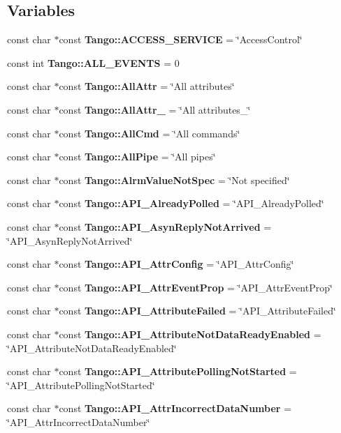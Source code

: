 \subsection*{Variables}
\begin{DoxyCompactItemize}
\item 
const char $\ast$const {\bf Tango\-::\-A\-C\-C\-E\-S\-S\-\_\-\-S\-E\-R\-V\-I\-C\-E} = \char`\"{}Access\-Control\char`\"{}
\item 
const int {\bf Tango\-::\-A\-L\-L\-\_\-\-E\-V\-E\-N\-T\-S} = 0
\item 
const char $\ast$const {\bf Tango\-::\-All\-Attr} = \char`\"{}All attributes\char`\"{}
\item 
const char $\ast$const {\bf Tango\-::\-All\-Attr\-\_} = \char`\"{}All attributes\-\_\char`\"{}
\item 
const char $\ast$const {\bf Tango\-::\-All\-Cmd} = \char`\"{}All commands\char`\"{}
\item 
const char $\ast$const {\bf Tango\-::\-All\-Pipe} = \char`\"{}All pipes\char`\"{}
\item 
const char $\ast$const {\bf Tango\-::\-Alrm\-Value\-Not\-Spec} = \char`\"{}Not specified\char`\"{}
\item 
const char $\ast$const {\bf Tango\-::\-A\-P\-I\-\_\-\-Already\-Polled} = \char`\"{}A\-P\-I\-\_\-\-Already\-Polled\char`\"{}
\item 
const char $\ast$const {\bf Tango\-::\-A\-P\-I\-\_\-\-Asyn\-Reply\-Not\-Arrived} = \char`\"{}A\-P\-I\-\_\-\-Asyn\-Reply\-Not\-Arrived\char`\"{}
\item 
const char $\ast$const {\bf Tango\-::\-A\-P\-I\-\_\-\-Attr\-Config} = \char`\"{}A\-P\-I\-\_\-\-Attr\-Config\char`\"{}
\item 
const char $\ast$const {\bf Tango\-::\-A\-P\-I\-\_\-\-Attr\-Event\-Prop} = \char`\"{}A\-P\-I\-\_\-\-Attr\-Event\-Prop\char`\"{}
\item 
const char $\ast$const {\bf Tango\-::\-A\-P\-I\-\_\-\-Attribute\-Failed} = \char`\"{}A\-P\-I\-\_\-\-Attribute\-Failed\char`\"{}
\item 
const char $\ast$const {\bf Tango\-::\-A\-P\-I\-\_\-\-Attribute\-Not\-Data\-Ready\-Enabled} = \char`\"{}A\-P\-I\-\_\-\-Attribute\-Not\-Data\-Ready\-Enabled\char`\"{}
\item 
const char $\ast$const {\bf Tango\-::\-A\-P\-I\-\_\-\-Attribute\-Polling\-Not\-Started} = \char`\"{}A\-P\-I\-\_\-\-Attribute\-Polling\-Not\-Started\char`\"{}
\item 
const char $\ast$const {\bf Tango\-::\-A\-P\-I\-\_\-\-Attr\-Incorrect\-Data\-Number} = \char`\"{}A\-P\-I\-\_\-\-Attr\-Incorrect\-Data\-Number\char`\"{}

\end{DoxyCompactItemize}
